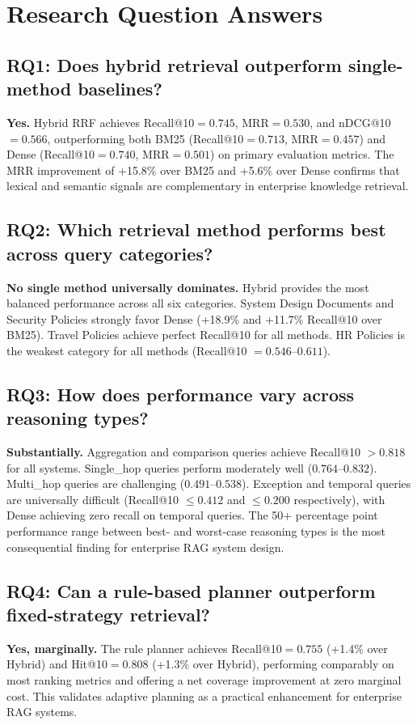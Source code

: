 \section{Research Question Answers}
\label{sec:conc_rqs}

\subsection*{RQ1: Does hybrid retrieval outperform single-method baselines?}
\textbf{Yes.} Hybrid RRF achieves Recall@10$={0.745}$, MRR$={0.530}$, and nDCG@10$={0.566}$, outperforming both BM25 (Recall@10$={0.713}$, MRR$={0.457}$) and Dense (Recall@10$={0.740}$, MRR$={0.501}$) on primary evaluation metrics. The MRR improvement of +15.8\% over BM25 and +5.6\% over Dense confirms that lexical and semantic signals are complementary in enterprise knowledge retrieval.

\subsection*{RQ2: Which retrieval method performs best across query categories?}
\textbf{No single method universally dominates.} Hybrid provides the most balanced performance across all six categories. System Design Documents and Security Policies strongly favor Dense (+18.9\% and +11.7\% Recall@10 over BM25). Travel Policies achieve perfect Recall@10 for all methods. HR Policies is the weakest category for all methods (Recall@10 $={0.546}$--$0.611$).

\subsection*{RQ3: How does performance vary across reasoning types?}
\textbf{Substantially.} Aggregation and comparison queries achieve Recall@10 $>{0.818}$ for all systems. Single\_hop queries perform moderately well ($0.764$--$0.832$). Multi\_hop queries are challenging ($0.491$--$0.538$). Exception and temporal queries are universally difficult (Recall@10 $\leq{0.412}$ and $\leq{0.200}$ respectively), with Dense achieving zero recall on temporal queries. The 50+ percentage point performance range between best- and worst-case reasoning types is the most consequential finding for enterprise RAG system design.

\subsection*{RQ4: Can a rule-based planner outperform fixed-strategy retrieval?}
\textbf{Yes, marginally.} The rule planner achieves Recall@10$={0.755}$ (+1.4\% over Hybrid) and Hit@10$={0.808}$ (+1.3\% over Hybrid), performing comparably on most ranking metrics and offering a net coverage improvement at zero marginal cost. This validates adaptive planning as a practical enhancement for enterprise RAG systems.

